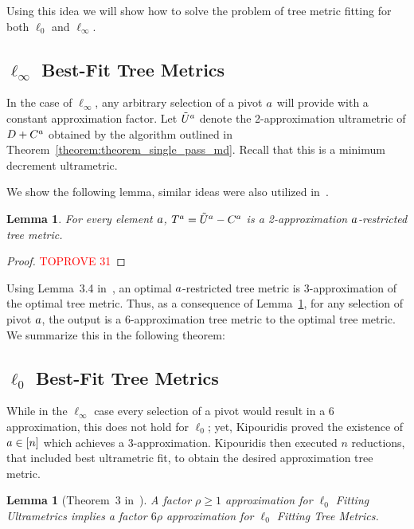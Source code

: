 \documentclass{article}
\newtheorem{lemma}[theorem]{Lemma}
\begin{document}
Using this idea we will show how to solve the problem of tree metric fitting for both $\ell_0$ and $\ell_\infty$.

\subsection{\texorpdfstring{$\ell_\infty$ Best-Fit Tree Metrics}{l-infty Best-Fit Tree Metrics}} 
In the case of $\ell_\infty$, any arbitrary selection of a pivot $a$ will provide with a constant approximation factor. 
Let $\tilde{U}^a$ denote the 2-approximation ultrametric of $D+C^a$ obtained by the algorithm outlined in Theorem~\ref{theorem:theorem_single_pass_md}. Recall that this is a minimum decrement ultrametric.

We show the following lemma, similar ideas were also utilized in~\cite{agarwala}. 

\begin{lemma}\label{lemma:linf_tree_metric}
For every element $a$, $T^a = \tilde{U}^a - C^a$ is a 2-approximation $a$-restricted tree metric.
\end{lemma}

\begin{proof}\textcolor{red}{TOPROVE 31}\end{proof}

Using Lemma~3.4 in~\cite{agarwala}, an optimal $a$-restricted tree metric is 3-approximation of the optimal tree metric. Thus, as a consequence of Lemma~\ref{lemma:linf_tree_metric}, for any selection of pivot $a$, the output is a 6-approximation tree metric to the optimal tree metric. We summarize this in the following theorem:

\inftyreduction* 

\subsection{\texorpdfstring{$\ell_0$ Best-Fit Tree Metrics}{l-0 Best-Fit Tree Metrics}} 

While in the $\ell_\infty$ case every selection of a pivot would result in a 6 approximation, this does not hold for $\ell_0$; yet, Kipouridis proved the existence of $a \in [n]$ which achieves a 3-approximation. Kipouridis then executed $n$ reductions, that included best ultrametric fit, to obtain the desired approximation tree metric. 

\begin{lemma}[Theorem~3 in~\cite{kipouridis2023fitting}]\label{lemma:best_tree_0}
A factor $\rho \geq 1$ approximation for $\ell_0$ Fitting Ultrametrics implies a factor $6\rho$
approximation for $\ell_0$ Fitting Tree Metrics.
\end{lemma}
\end{document}
